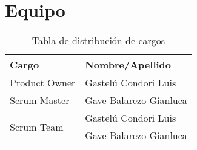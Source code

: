 \chapter{Equipo}
\begin{table}[htbp]
	\begin{center}
		\begin{tabular}{|l|l|}
			\hline
			Cargo & Nombre/Apellido \\
			\hline \hline
			Product Owner &  Gastelú Condori Luis\\ \hline
			Scrum Master & Gave Balarezo Gianluca \\ \hline \multirow{2}{1cm}{Scrum Team} & Gastelú Condori Luis \\ \cline{2-2}
			& Gave Balarezo Gianluca \\ \hline
		\end{tabular}
	\caption{Tabla de distribución de cargos}
	\end{center}
\end{table}